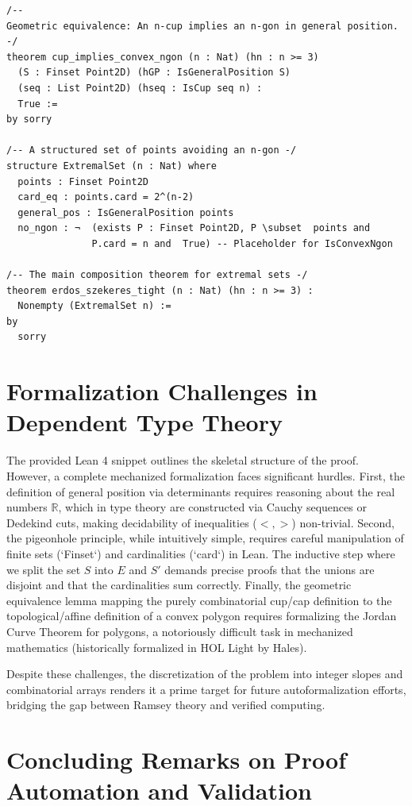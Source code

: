 \documentclass[11pt,a4paper]{article}
\begin{document}
\begin{verbatim}
/--
Geometric equivalence: An n-cup implies an n-gon in general position.
-/
theorem cup_implies_convex_ngon (n : Nat) (hn : n >= 3)
  (S : Finset Point2D) (hGP : IsGeneralPosition S)
  (seq : List Point2D) (hseq : IsCup seq n) :
  True :=
by sorry

/-- A structured set of points avoiding an n-gon -/
structure ExtremalSet (n : Nat) where
  points : Finset Point2D
  card_eq : points.card = 2^(n-2)
  general_pos : IsGeneralPosition points
  no_ngon : ¬  (exists P : Finset Point2D, P \subset  points and
               P.card = n and  True) -- Placeholder for IsConvexNgon

/-- The main composition theorem for extremal sets -/
theorem erdos_szekeres_tight (n : Nat) (hn : n >= 3) :
  Nonempty (ExtremalSet n) :=
by
  sorry
\end{verbatim}

\section{Formalization Challenges in Dependent Type Theory}
The provided Lean 4 snippet outlines the skeletal structure of the proof. However, a complete mechanized formalization faces significant hurdles.
First, the definition of general position via determinants requires reasoning about the real numbers $\mathbb{R}$, which in type theory are constructed via Cauchy sequences or Dedekind cuts, making decidability of inequalities ($<, >$) non-trivial.
Second, the pigeonhole principle, while intuitively simple, requires careful manipulation of finite sets (`Finset`) and cardinalities (`card`) in Lean. The inductive step where we split the set $S$ into $E$ and $S'$ demands precise proofs that the unions are disjoint and that the cardinalities sum correctly.
Finally, the geometric equivalence lemma mapping the purely combinatorial cup/cap definition to the topological/affine definition of a convex polygon requires formalizing the Jordan Curve Theorem for polygons, a notoriously difficult task in mechanized mathematics (historically formalized in HOL Light by Hales).

Despite these challenges, the discretization of the problem into integer slopes and combinatorial arrays renders it a prime target for future autoformalization efforts, bridging the gap between Ramsey theory and verified computing.

\section{Concluding Remarks on Proof Automation and Validation}
\end{document}
